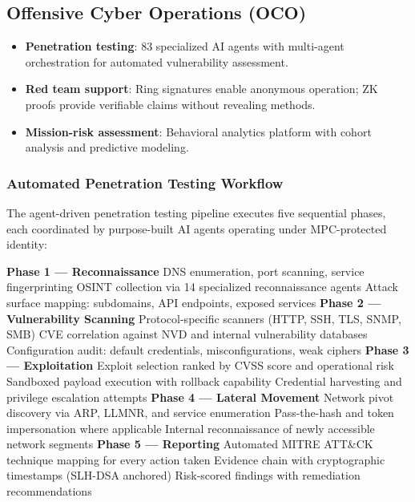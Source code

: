 \documentclass[11pt,letterpaper]{article}
\begin{document}
\subsection{Offensive Cyber Operations (OCO)}

\begin{itemize}
\item \textbf{Penetration testing}: 83 specialized AI agents with multi-agent orchestration for automated vulnerability assessment.
\item \textbf{Red team support}: Ring signatures enable anonymous operation; ZK proofs provide verifiable claims without revealing methods.
\item \textbf{Mission-risk assessment}: Behavioral analytics platform with cohort analysis and predictive modeling.
\end{itemize}

\subsubsection{Automated Penetration Testing Workflow}

The agent-driven penetration testing pipeline executes five sequential phases, each coordinated by purpose-built AI agents operating under MPC-protected identity:

\begin{algorithm}[H]
\caption{Agent-Driven Penetration Testing Pipeline}
\begin{algorithmic}[1]
\State \textbf{Phase 1 --- Reconnaissance}
\State DNS enumeration, port scanning, service fingerprinting
\State OSINT collection via 14 specialized reconnaissance agents
\State Attack surface mapping: subdomains, API endpoints, exposed services
\Statex
\State \textbf{Phase 2 --- Vulnerability Scanning}
\State Protocol-specific scanners (HTTP, SSH, TLS, SNMP, SMB)
\State CVE correlation against NVD and internal vulnerability databases
\State Configuration audit: default credentials, misconfigurations, weak ciphers
\Statex
\State \textbf{Phase 3 --- Exploitation}
\State Exploit selection ranked by CVSS score and operational risk
\State Sandboxed payload execution with rollback capability
\State Credential harvesting and privilege escalation attempts
\Statex
\State \textbf{Phase 4 --- Lateral Movement}
\State Network pivot discovery via ARP, LLMNR, and service enumeration
\State Pass-the-hash and token impersonation where applicable
\State Internal reconnaissance of newly accessible network segments
\Statex
\State \textbf{Phase 5 --- Reporting}
\State Automated MITRE ATT\&CK technique mapping for every action taken
\State Evidence chain with cryptographic timestamps (SLH-DSA anchored)
\State Risk-scored findings with remediation recommendations
\end{algorithmic}
\end{algorithm}
\end{document}
